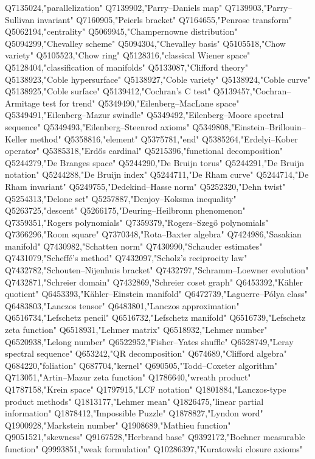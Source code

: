 Q7135024,"parallelization"
Q7139902,"Parry–Daniels map"
Q7139903,"Parry–Sullivan invariant"
Q7160905,"Peierls bracket"
Q7164655,"Penrose transform"
Q5062194,"centrality"
Q5069945,"Champernowne distribution"
Q5094299,"Chevalley scheme"
Q5094304,"Chevalley basis"
Q5105518,"Chow variety"
Q5105523,"Chow ring"
Q5128316,"classical Wiener space"
Q5128404,"classification of manifolds"
Q5133087,"Clifford theory"
Q5138923,"Coble hypersurface"
Q5138927,"Coble variety"
Q5138924,"Coble curve"
Q5138925,"Coble surface"
Q5139412,"Cochran's C test"
Q5139457,"Cochran–Armitage test for trend"
Q5349490,"Eilenberg–MacLane space"
Q5349491,"Eilenberg–Mazur swindle"
Q5349492,"Eilenberg–Moore spectral sequence"
Q5349493,"Eilenberg–Steenrod axioms"
Q5349808,"Einstein–Brillouin–Keller method"
Q5358816,"element"
Q5375781,"end"
Q5385264,"Erdelyi–Kober operator"
Q5385318,"Erdős cardinal"
Q5215396,"functional decomposition"
Q5244279,"De Branges space"
Q5244290,"De Bruijn torus"
Q5244291,"De Bruijn notation"
Q5244288,"De Bruijn index"
Q5244711,"De Rham curve"
Q5244714,"De Rham invariant"
Q5249755,"Dedekind–Hasse norm"
Q5252320,"Dehn twist"
Q5254313,"Delone set"
Q5257887,"Denjoy–Koksma inequality"
Q5263725,"descent"
Q5266175,"Deuring–Heilbronn phenomenon"
Q7359351,"Rogers polynomials"
Q7359379,"Rogers–Szegő polynomials"
Q7366296,"Room square"
Q7370348,"Rota–Baxter algebra"
Q7424986,"Sasakian manifold"
Q7430982,"Schatten norm"
Q7430990,"Schauder estimates"
Q7431079,"Scheffé's method"
Q7432097,"Scholz's reciprocity law"
Q7432782,"Schouten–Nijenhuis bracket"
Q7432797,"Schramm–Loewner evolution"
Q7432871,"Schreier domain"
Q7432869,"Schreier coset graph"
Q6453392,"Kähler quotient"
Q6453393,"Kähler–Einstein manifold"
Q6472739,"Laguerre–Pólya class"
Q6483803,"Lanczos tensor"
Q6483801,"Lanczos approximation"
Q6516734,"Lefschetz pencil"
Q6516732,"Lefschetz manifold"
Q6516739,"Lefschetz zeta function"
Q6518931,"Lehmer matrix"
Q6518932,"Lehmer number"
Q6520938,"Lelong number"
Q6522952,"Fisher–Yates shuffle"
Q6528749,"Leray spectral sequence"
Q653242,"QR decomposition"
Q674689,"Clifford algebra"
Q684220,"foliation"
Q687704,"kernel"
Q690505,"Todd–Coxeter algorithm"
Q713051,"Artin–Mazur zeta function"
Q1786640,"wreath product"
Q1787158,"Krein space"
Q1797915,"LCF notation"
Q1801884,"Lanczos-type product methods"
Q1813177,"Lehmer mean"
Q1826475,"linear partial information"
Q1878412,"Impossible Puzzle"
Q1878827,"Lyndon word"
Q1900928,"Markstein number"
Q1908689,"Mathieu function"
Q9051521,"skewness"
Q9167528,"Herbrand base"
Q9392172,"Bochner measurable function"
Q9993851,"weak formulation"
Q10286397,"Kuratowski closure axioms"
